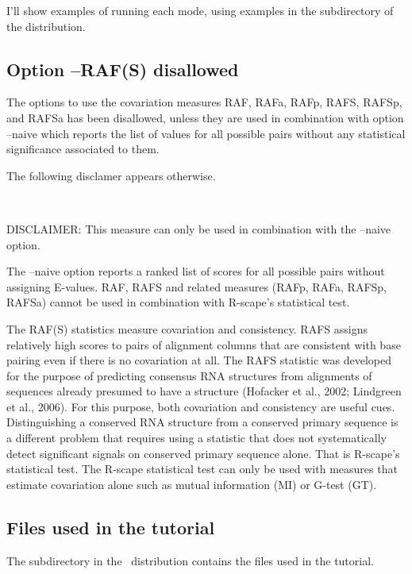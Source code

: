 I'll show examples of running each mode, using examples in the
 subdirectory of the distribution.


\subsection {Option --RAF(S) disallowed}

The options to use the covariation measures RAF, RAFa, RAFp, RAFS, RAFSp, and RAFSa has
been disallowed, unless they are used in combination with option
--naive which reports the list of values for all possible pairs
without any statistical significance associated to them.

The following disclamer appears otherwise.

\\

\begin{sreoutput}
DISCLAIMER: This measure can only be used in combination with the --naive option.

The --naive option reports a ranked list of scores for all possible
pairs without assigning E-values. RAF, RAFS and related measures
(RAFp, RAFa, RAFSp, RAFSa) cannot be used in combination with
R-scape's statistical test.

The RAF(S) statistics measure covariation and consistency. RAFS
assigns relatively high scores to pairs of alignment columns that are
consistent with base pairing even if there is no covariation at
all. The RAFS statistic was developed for the purpose of predicting
consensus RNA structures from alignments of sequences already presumed
to have a structure (Hofacker et al., 2002; Lindgreen et al.,
2006). For this purpose, both covariation and consistency are useful
cues. Distinguishing a conserved RNA structure from a conserved
primary sequence is a different problem that requires using a
statistic that does not systematically detect significant signals on
conserved primary sequence alone. That is R-scape's statistical
test. The R-scape statistical test can only be used with measures that
estimate covariation alone such as mutual information (MI) or G-test
(GT).
\end{sreoutput}

\subsection{Files used in the tutorial}

The subdirectory  in the \rscape\ distribution contains the
files used in the tutorial. 

